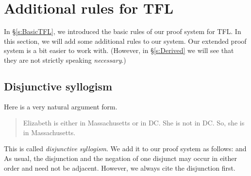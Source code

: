 \chapter{Additional rules for TFL}\label{s:Further}
In \S\ref{s:BasicTFL}, we introduced the basic rules of our proof system for TFL. In this section, we will add some additional rules to our system. Our extended proof system is a bit easier to work with. (However, in \S\ref{s:Derived} we will see that they are not strictly speaking \emph{necessary}.)


\section{Disjunctive syllogism}
Here is a very natural argument form.
	\begin{quote}
		Elizabeth is either in Massachusetts or in DC. She is not in DC. So, she is in Massachusetts.
	\end{quote}
This is called \emph{disjunctive syllogism}. We add it to our proof system as follows:
and
As usual, the disjunction and the negation of one disjunct may occur in either order and need not be adjacent. However, we always cite the disjunction first.

